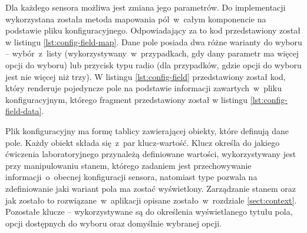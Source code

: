 Dla każdego sensora możliwa jest zmiana jego parametrów. Do implementacji wykorzystana została
metoda mapowania pól~w~całym komponencie na podstawie pliku konfiguracyjnego.
Odpowiadający za to kod przedstawiony został w listingu \ref{lst:config-field-map}. Dane pole
posiada dwa różne warianty do wyboru -- wybór~z~listy (wykorzystywany~w~przypadkach, gdy dany
parametr ma więcej opcji do wyboru) lub przycisk typu radio (dla przypadków, gdzie opcji do wyboru
jest nie więcej niż trzy). W listingu \ref{lst:config-field} przedstawiony został kod, który
renderuje pojedyncze pole na podstawie informacji zawartych~w~pliku konfiguracyjnym, którego
fragment przedstawiony został w listingu \ref{lst:config-field-data}.




Plik konfiguracyjny ma formę tablicy zawierającej obiekty, które definują dane pole. Każdy obiekt
składa się~z~par klucz-wartość. Klucz  określa do jakiego ćwiczenia laboratoryjnego
przynależą definiowane wartości,  wykorzystywany jest przy manipulowaniu stanem,
którego zadaniem jest przechowywanie informacji~o~obecnej konfiguracji sensora, natomiast 
{type} pozwala na zdefiniowanie jaki wariant pola ma zostać wyświetlony. Zarządzanie stanem oraz
jak zostało to rozwiązane~w~aplikacji opisane zostało~w~rozdziale \ref{sect:context}. Pozostałe
klucze --
 wykorzystywane są do określenia wyświetlanego
tytułu pola, opcji dostępnych do wyboru oraz domyślnie wybranej opcji.
